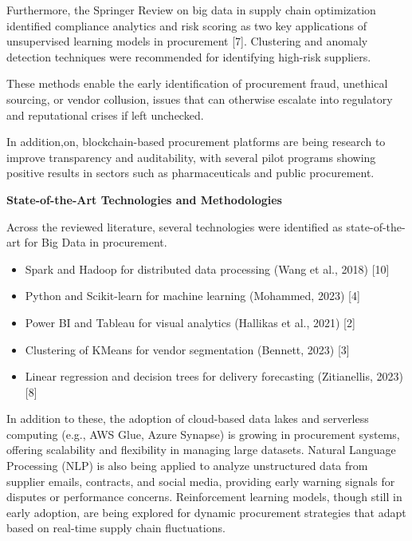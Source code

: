 \documentclass[10pt, onecolumn]{article}
\begin{document}
\vspace{\baselineskip}

Furthermore, the Springer Review on big data in supply chain optimization identified compliance analytics and risk scoring as two key applications of unsupervised learning models in procurement [7]. Clustering and anomaly detection techniques were recommended for identifying high-risk suppliers.

\vspace{\baselineskip}
These methods enable the early identification of procurement fraud, unethical sourcing, or vendor collusion, issues that can otherwise escalate into regulatory and reputational crises if left unchecked.

\vspace{\baselineskip}
In addition,on, blockchain-based procurement platforms are being research to improve transparency and auditability, with several pilot programs showing positive results in sectors such as pharmaceuticals and public procurement.
\vspace{\baselineskip}


\vspace{\baselineskip}
\noindent\textbf{State-of-the-Art Technologies and Methodologies}
\vspace{\baselineskip}

Across the reviewed literature, several technologies were identified as state-of-the-art for Big Data in procurement.

\begin{itemize}
  \item Spark and Hadoop for distributed data processing (Wang et al., 2018) [10]
  \item Python and Scikit-learn for machine learning (Mohammed, 2023) [4]
  \item Power BI and Tableau for visual analytics (Hallikas et al., 2021) [2]
  \item Clustering of KMeans for vendor segmentation (Bennett, 2023) [3]
  \item Linear regression and decision trees for delivery forecasting (Zitianellis, 2023) [8]
\end{itemize}

In addition to these, the adoption of cloud-based data lakes and serverless computing (e.g., AWS Glue, Azure Synapse) is growing in procurement systems, offering scalability and flexibility in managing large datasets.
\vspace{\baselineskip}
Natural Language Processing (NLP) is also being applied to analyze unstructured data from supplier emails, contracts, and social media, providing early warning signals for disputes or performance concerns.
\vspace{\baselineskip}
Reinforcement learning models, though still in early adoption, are being explored for dynamic procurement strategies that adapt based on real-time supply chain fluctuations.
 
\end{document}
